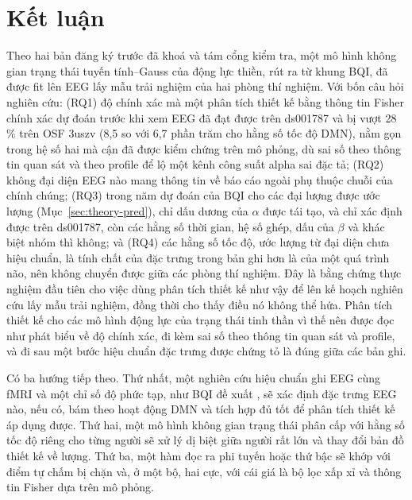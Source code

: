 \section{Kết luận}
\label{sec:conclusion}
Theo hai bản đăng ký trước đã khoá và tám cổng kiểm tra, một mô hình không gian trạng thái tuyến tính--Gauss của động lực thiền, rút ra từ khung BQI, đã được fit lên EEG lấy mẫu trải nghiệm của hai phòng thí nghiệm. Với bốn câu hỏi nghiên cứu: (RQ1) độ chính xác mà một phân tích thiết kế bằng thông tin Fisher chính xác dự đoán trước khi xem EEG đã đạt được trên ds001787 và bị vượt 28\,\% trên OSF 3uszv (8,5 so với 6,7 phần trăm cho hằng số tốc độ DMN), nằm gọn trong hệ số hai mà cận đã được kiểm chứng trên mô phỏng, dù sai số theo thông tin quan sát và theo profile để lộ một kênh công suất alpha sai đặc tả; (RQ2) không đại diện EEG nào mang thông tin về báo cáo ngoài phụ thuộc chuỗi của chính chúng; (RQ3) trong năm dự đoán của BQI cho các đại lượng được ước lượng (Mục~\ref{sec:theory-pred}), chỉ dấu dương của $\alpha$ được tái tạo, và chỉ xác định được trên ds001787, còn các hằng số thời gian, hệ số ghép, dấu của $\beta$ và khác biệt nhóm thì không; và (RQ4) các hằng số tốc độ, ước lượng từ đại diện chưa hiệu chuẩn, là tính chất của đặc trưng trong bản ghi hơn là của một quá trình não, nên không chuyển được giữa các phòng thí nghiệm. Đây là bằng chứng thực nghiệm đầu tiên cho việc dùng phân tích thiết kế như vậy để lên kế hoạch nghiên cứu lấy mẫu trải nghiệm, đồng thời cho thấy điều nó không thể hứa. Phân tích thiết kế cho các mô hình động lực của trạng thái tinh thần vì thế nên được đọc như phát biểu về độ chính xác, đi kèm sai số theo thông tin quan sát và profile, và đi sau một bước hiệu chuẩn đặc trưng được chứng tỏ là đúng giữa các bản ghi.

Có ba hướng tiếp theo. Thứ nhất, một nghiên cứu hiệu chuẩn ghi EEG cùng fMRI và một chỉ số độ phức tạp, như BQI đề xuất \cite[Mục~14]{BQI}, sẽ xác định đặc trưng EEG nào, nếu có, bám theo hoạt động DMN và tích hợp đủ tốt để phân tích thiết kế áp dụng được. Thứ hai, một mô hình không gian trạng thái phân cấp với hằng số tốc độ riêng cho từng người sẽ xử lý dị biệt giữa người rất lớn và thay đổi bản đồ thiết kế về lượng. Thứ ba, một hàm đọc ra phi tuyến hoặc thứ bậc sẽ khớp với điểm tự chấm bị chặn và, ở một bộ, hai cực, với cái giá là bộ lọc xấp xỉ và thông tin Fisher dựa trên mô phỏng.
